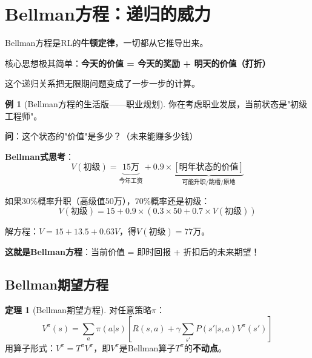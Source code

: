 \documentclass[11pt,a4paper]{article}
\theoremstyle{definition}
\newtheorem{example}{例}[section]
\newtheorem{theorem}{定理}[section]
\begin{document}
\section{Bellman方程：递归的威力}

\begin{plainwords}
Bellman方程是RL的\textbf{牛顿定律}，一切都从它推导出来。

核心思想极其简单：\textbf{今天的价值 = 今天的奖励 + 明天的价值（打折）}

这个递归关系把无限期问题变成了一步一步的计算。
\end{plainwords}

\begin{example}[Bellman方程的生活版——职业规划]
你在考虑职业发展，当前状态是"初级工程师"。

\textbf{问}：这个状态的"价值"是多少？（未来能赚多少钱）

\textbf{Bellman式思考}：
\[
V(\text{初级}) = \underbrace{15\text{万}}_{\text{今年工资}} + 0.9 \times \underbrace{[\text{明年状态的价值}]}_{\text{可能升职/跳槽/原地}}
\]

如果30\%概率升职（高级值50万），70\%概率还是初级：
\[
V(\text{初级}) = 15 + 0.9 \times (0.3 \times 50 + 0.7 \times V(\text{初级}))
\]

解方程：$V = 15 + 13.5 + 0.63V$，得$V(\text{初级}) = 77$万。

\textbf{这就是Bellman方程}：当前价值 = 即时回报 + 折扣后的未来期望！
\end{example}

\subsection{Bellman期望方程}

\begin{theorem}[Bellman期望方程]
对任意策略$\pi$：
\[
V^\pi(s) = \sum_a \pi(a|s) \left[R(s,a) + \gamma \sum_{s'} P(s'|s,a) V^\pi(s')\right]
\]
用算子形式：$V^\pi = T^\pi V^\pi$，即$V^\pi$是Bellman算子$T^\pi$的\textbf{不动点}。
\end{theorem}
\end{document}
